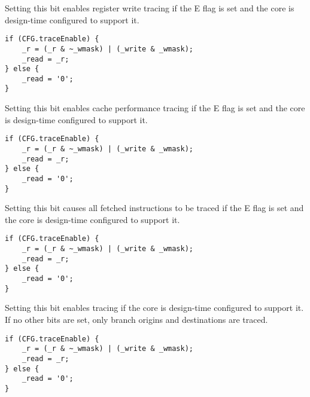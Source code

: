 Setting this bit enables register write tracing if the E flag is set and the 
core is design-time configured to support it.

\declaration{}
\implementation{}
\begin{lstlisting}
if (CFG.traceEnable) {
    _r = (_r & ~_wmask) | (_write & _wmask);
    _read = _r;
} else {
    _read = '0';
}
\end{lstlisting}

Setting this bit enables cache performance tracing if the E flag is set and the 
core is design-time configured to support it.

\declaration{}
\implementation{}
\begin{lstlisting}
if (CFG.traceEnable) {
    _r = (_r & ~_wmask) | (_write & _wmask);
    _read = _r;
} else {
    _read = '0';
}
\end{lstlisting}

Setting this bit causes all fetched instructions to be traced if the E flag is 
set and the core is design-time configured to support it.

\declaration{}
\implementation{}
\begin{lstlisting}
if (CFG.traceEnable) {
    _r = (_r & ~_wmask) | (_write & _wmask);
    _read = _r;
} else {
    _read = '0';
}
\end{lstlisting}

Setting this bit enables tracing if the core is design-time configured to 
support it. If no other bits are set, only branch origins and destinations are 
traced.

\declaration{}
\implementation{}
\begin{lstlisting}
if (CFG.traceEnable) {
    _r = (_r & ~_wmask) | (_write & _wmask);
    _read = _r;
} else {
    _read = '0';
}
\end{lstlisting}

